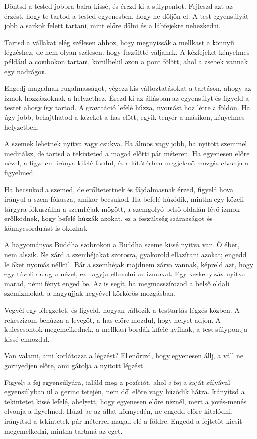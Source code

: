Döntsd a tested jobbra-balra kissé, és érezd ki a súlypontot. Fejleszd
azt az érzést, hogy te tartod a tested egyenesben, hogy ne dőljön el. A
test egyensúlyát jobb a sarkok felett tartani, mint előre dőlni és a
lábfejekre nehezkedni.

Tartsd a vállakat elég szélesen ahhoz, hogy megnyissák a mellkast a
könnyű légzéshez, de nem olyan szélesen, hogy feszültté váljanak. A
kézfejeket kényelmes például a combokon tartani, körülbelül azon a pont
fölött, ahol a zsebek vannak egy nadrágon.

Engedj magadnak rugalmasságot, végezz kis változtatásokat a tartáson,
ahogy az izmok hozzászoknak a helyzethez. Érezd ki az állásban az
egyensúlyt és figyeld a testet ahogy így tartod. A gravitáció lefelé
húzza, nyomást hoz létre a földön. Ha úgy jobb, behajthatod a kezeket a
has előtt, egyik tenyér a másikon, kényelmes helyzetben.

A szemek lehetnek nyitva vagy csukva. Ha álmos vagy jobb, ha nyitott
szemmel meditálsz, de tartsd a tekinteted a magad előtti pár méteren. Ha
egyenesen előre nézel, a figyelem iránya kifelé fordul, és a látótérben
megjelenő mozgás elvonja a figyelmed.

Ha becsukod a szemed, de erőltetettnek és fájdalmasnak érzed, figyeld
hova irányul a szem fókusza, amikor becsukod. Ha befelé húzódik, mintha
egy közeli tárgyra fókuszálna a szemhéjak mögött, a szemgolyó belső
oldalán lévő izmok erőlködnek, hogy befelé húzzák azokat, ez a
feszültség szárazságot és könnycsordulást is okozhat.

A hagyományos Buddha szobrokon a Buddha szeme kissé nyitva van. Ő éber,
nem alszik. Ne zárd a szemhéjakat szorosra, gyakorold ellazítani azokat;
engedd le őket nyomás nélkül. Bár a szemhéjak majdnem zárva vannak,
képzeld azt, hogy egy távoli dologra nézel, ez hagyja ellazulni az
izmokat. Egy keskeny sáv nyitva marad, némi fényt enged be. Az is segít,
ha megmasszírozod a belső oldali szemizmokat, a nagyujjak hegyével
körkörös mozgásban.

Vegyél egy lélegzetet, és figyeld, hogyan változik a testtartás légzés
közben. A rekeszizom behúzza a levegőt, a has előre mozdul, hogy helyet
adjon. A kulcscsontok megemelkednek, a mellkasi bordák kifelé nyílnak, a
test súlypontja kissé elmozdul.

Van valami, ami korlátozza a légzést? Ellenőrizd, hogy egyenesen állj, a
váll ne görnyedjen előre, ami gátolja a nyitott légzést.

Figyelj a fej egyensúlyára, találd meg a pozíciót, ahol a fej a saját
súlyával egyensúlyban ül a gerinc tetején, nem dől előre vagy húzódik
hátra. Irányítsd a tekintetet kissé lefelé, ahelyett, hogy egyenesen
előre néznél, mert a jövés-menés elvonja a figyelmed. Húzd be az állat
könnyedén, ne engedd előre kitolódni, irányítsd a tekintetek pár
méterrel magad elé a földre. Engedd a fejtetőt kicsit megemelkedni,
mintha tartaná az eget.

